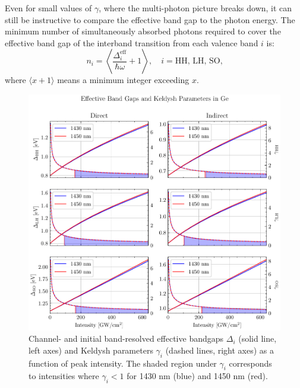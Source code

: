 Even for small values of $\gamma$, where the multi-photon picture breaks down, it can still be instructive to compare the effective band gap to the photon energy. The minimum number of simultaneously absorbed photons required to cover the effective band gap of the interband transition from each valence band $i$ is:
\begin{equation}
	n_i = \left\langle  \frac{\Delta_i^{\textrm{eff}}}{\hbar \omega} + 1 \right\rangle, \quad i = \textrm{HH, LH, SO,}
	\label{eqn:min_number_photons}
\end{equation}
where $\langle x+1 \rangle$ means a minimum integer exceeding $x$.

\begin{figure}
	\centering
	\includegraphics[width=1.0\textwidth]{figures/chap4/Gamma_Gap_Channel_VB_resolved.pdf}
	\caption{Channel- and initial band-resolved effective bandgaps $\Delta_i$ (solid line, left axes) and Keldysh parameters $\gamma_i$ (dashed lines, right axes) as a function of peak intensity. The shaded region under $\gamma_i$ corresponds to intensities where $\gamma_i < 1$ for 1430 nm (blue) and 1450 nm (red).}
	\label{fig:Gamma_Gap_Channel_VB_resolved}
\end{figure}

